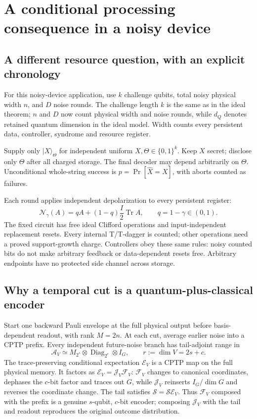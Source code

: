 \documentclass[11pt,a4paper]{article}
\newcommand{\Tr}{\operatorname{Tr}}
\newcommand{\ket}[1]{\lvert #1\rangle}
\newcommand{\newsection}[1]{\section{#1}}
\begin{document}
\newsection{A conditional processing consequence in a noisy device}
\label{sec:noisy-processing}
\subsection{A different resource question, with an explicit chronology}
For this noisy-device application, use $k$ challenge qubits, total noisy physical width $n$, and $D$ noise rounds. The challenge length $k$ is the same as in the ideal theorem; $n$ and $D$ now count physical width and noise rounds, while $d_Q$ denotes retained quantum dimension in the ideal model. Width counts every persistent data, controller, syndrome and resource register.

Supply only $\ket X_\Theta$ for independent uniform $X,\Theta\in\{0,1\}^k$. Keep $X$ secret; disclose only $\Theta$ after all charged storage. The final decoder may depend arbitrarily on $\Theta$. Unconditional whole-string success is $p=\Pr[\widehat X=X]$, with aborts counted as failures.

Each round applies independent depolarization to every persistent register:
\[
\mathcal N_\gamma(A)=qA+(1-q)\frac I2\Tr A,
\qquad q=1-\gamma\in(0,1).
\]
The fixed circuit has free ideal Clifford operations and input-independent replacement resets. Every internal T/T-dagger is counted; other operations need a proved support-growth charge. Controllers obey these same rules: noisy counted bits do not make arbitrary feedback or data-dependent resets free. Arbitrary endpoints have no protected side channel across storage.

\subsection{Why a temporal cut is a quantum-plus-classical encoder}
Start one backward Pauli envelope at the full physical output before basis-dependent readout, with rank $M=2n$. At each cut, average earlier noise into a CPTP prefix. Every independent future-noise branch has tail-adjoint range in
\[
\mathcal A_V\simeq M_{2^s}\otimes\operatorname{Diag}_{2^c}\otimes I_G,
\qquad r:=\dim V=2s+c.
\]
The trace-preserving conditional expectation $\mathcal E_V$ is a CPTP map on the full physical memory. It factors as $\mathcal E_V=\mathcal J_V\mathcal F_V$: $\mathcal F_V$ changes to canonical coordinates, dephases the $c$-bit factor and traces out $G$, while $\mathcal J_V$ reinserts $I_G/\dim G$ and reverses the coordinate change. The tail satisfies $\mathcal S=\mathcal S\mathcal E_V$. Thus $\mathcal F_V$ composed with the prefix is a genuine $s$-qubit, $c$-bit encoder; composing $\mathcal J_V$ with the tail and readout reproduces the original outcome distribution.
\end{document}
